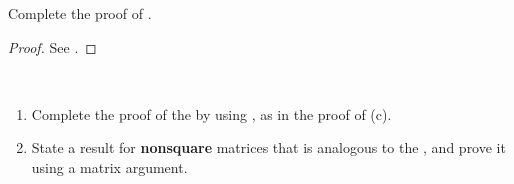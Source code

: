 \begin{exercise} \label{exercise 6.3.4}
Complete the proof of .
\end{exercise}

\begin{proof}
See .
\end{proof}

\begin{exercise} \label{exercise 6.3.5} \ 

\begin{enumerate}
\item Complete the proof of the  by using , as in the proof of (c).
\item State a result for \textbf{nonsquare} matrices that is analogous to the , and prove it using a matrix argument.
\end{enumerate}
\end{exercise}

